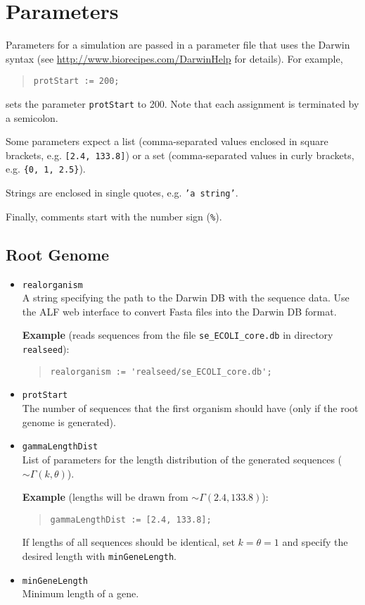 \documentclass[11pt]{article}
\begin{document}
\section{Parameters}
\label{sec.params}
Parameters for a simulation are passed in a parameter file that uses the Darwin syntax (see \url{http://www.biorecipes.com/DarwinHelp} for details). For example,
\begin{quote}
\texttt{protStart := 200;}
\end{quote}
sets the parameter \texttt{protStart} to 200. Note that each assignment is terminated by a semicolon.

Some parameters expect a list (comma-separated values enclosed in square brackets, e.g. \texttt{[2.4, 133.8]}) or a set (comma-separated values in curly brackets, e.g. \texttt{\{0, 1, 2.5\}}).

Strings are enclosed in single quotes, e.g. \texttt{'a string'}.

Finally, comments start with the number sign (\verb|%|).


\subsection{Root Genome}
\begin{itemize}
\item{\texttt{realorganism}} \hfill \\
 A string specifying the path to the Darwin DB with the sequence data. Use the ALF web interface to convert Fasta files into the Darwin DB format.

\noindent \textbf{Example} (reads sequences from the file \texttt{se\_ECOLI\_core.db} in directory \texttt{realseed}):
\begin{quote}
\begin{verbatim}
realorganism := 'realseed/se_ECOLI_core.db';
\end{verbatim}
\end{quote}
\item{\texttt{protStart}} \hfill \\
The number of sequences that the first organism should have (only if the root genome is generated).
\item{\texttt{gammaLengthDist}} \hfill \\
List of parameters for the length distribution of the generated sequences ($\sim\Gamma(k,\theta)$). 

\noindent \textbf{Example} (lengths will be drawn from $\sim\Gamma(2.4,133.8)$):
\begin{quote}
\begin{verbatim}
gammaLengthDist := [2.4, 133.8];
\end{verbatim}
\end{quote}
If lengths of all sequences should be identical, set $k=\theta=1$ and specify the desired length with \texttt{minGeneLength}.

\item{\texttt{minGeneLength}} \hfill \\
Minimum length of a gene.
\end{itemize}
\end{document}
